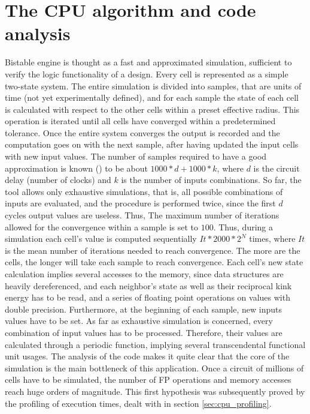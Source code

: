 \section{The CPU algorithm and code analysis}\label{sec:cpu_algorithm}
Bistable engine is thought as a fast and approximated simulation, sufficient to verify the logic functionality of a design. 
Every cell is represented as a simple two-state system. The entire simulation is divided into samples, that are units of time 
(not yet experimentally defined), and for each sample the state of each cell is calculated with respect to the other cells within 
a preset effective radius. This operation is iterated until all cells have converged within a predetermined tolerance. 
Once the entire system converges the output is recorded and the computation goes on with the next sample, after having updated
 the input cells with new input values.
The number of samples required to have a good approximation is known (\cite{site:MinaBistable}) to be about $1000*d+1000*k$, where $d$ is the circuit delay (number of clocks) and $k$ is the number of inputs combinations. So far, the tool allows only exhaustive simulations, that is, all possible combinations of inputs are evaluated, and the procedure is performed twice, since the first $d$ cycles output values are useless. Thus, 
 The maximum number of iterations allowed for the convergence within a sample is set to $100$. Thus, during a simulation each cell's value 
is computed sequentially $It*2000*2^N$ times, where $It$ is the mean number of iterations needed to reach convergence. 
The more are the cells, the longer will take each sample to reach convergence. Each cell's new state calculation implies several accesses to the memory, since data structures are heavily dereferenced, and each neighbor's state as well as their reciprocal kink energy has to be read, and a series of floating point operations on values with double precision. Furthermore, at the beginning of each sample, new inputs values have to be set. As far as exhaustive simulation is concerned, every combination of input values has to be processed. Therefore, their values are calculated through a periodic function, implying several transcendental functional unit usages.\newline
The analysis of the code makes it quite clear that the core of the simulation is the main bottleneck of this application. Once a circuit of millions of cells have to be simulated, the number of FP operations and memory accesses reach huge orders of magnitude. This first hypothesis was subsequently proved by the profiling of execution times, dealt with in section \ref{sec:cpu_profiling}.


